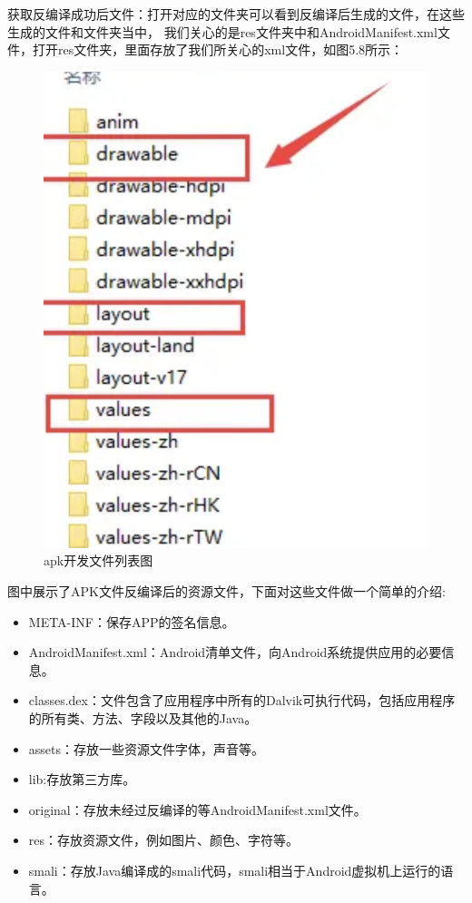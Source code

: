   获取反编译成功后文件：打开对应的文件夹可以看到反编译后生成的文件，在这些生成的文件和文件夹当中，
  我们关心的是res文件夹中和AndroidManifest.xml文件，打开res文件夹，里面存放了我们所关心的xml文件，如图5.8所示：
  \begin{figure}
    \centering
    \includegraphics[scale=0.5]{resources/img/i20.png}
    \caption{apk开发文件列表图}
  \end{figure}
  图中展示了APK文件反编译后的资源文件，下面对这些文件做一个简单的介绍:
  \begin{itemize}
    \item META-INF：保存APP的签名信息。
    \item AndroidManifest.xml：Android清单文件，向Android系统提供应用的必要信息。
    \item classes.dex：文件包含了应用程序中所有的Dalvik可执行代码，包括应用程序的所有类、方法、字段以及其他的Java。
    \item assets：存放一些资源文件字体，声音等。
    \item lib:存放第三方库。
    \item original：存放未经过反编译的等AndroidManifest.xml文件。
    \item res：存放资源文件，例如图片、颜色、字符等。
    \item smali：存放Java编译成的smali代码，smali相当于Android虚拟机上运行的语言。
\end{itemize}
